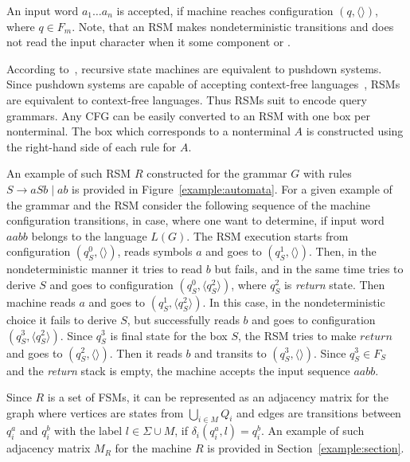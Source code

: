 An input word $a_1 \dots a_n$ is accepted, if machine reaches configuration $(q,\langle\rangle)$, where $q \in F_m$.
Note, that an RSM makes nondeterministic transitions and does not read the input character when it  some component or .

According to~\cite{rsm:analysis:10.1007/3-540-44585-4_18}, recursive state machines are equivalent to pushdown systems.
Since pushdown systems are capable of accepting context-free languages~\cite{automata:theory:10.5555/1177300}, RSMs are equivalent to context-free languages.
Thus RSMs suit to encode query grammars.
Any CFG can be easily converted to an RSM with one box per nonterminal.
The box which corresponds to a nonterminal $A$ is constructed using the right-hand side of each rule for $A$.

An example of such RSM $R$ constructed for the grammar $G$ with rules $S \to a S b \mid a b$ is provided in Figure~\ref{example:automata}. 
For a given example of the grammar and the RSM consider the following sequence of the machine configuration transitions, in case, where one want to determine, if input word $aabb$ belongs to the language $L(G)$. 
The RSM execution starts from configuration $(q_S^0,\langle \rangle)$, reads symbols $a$ and goes to $(q_S^1, \langle \rangle)$. 
Then, in the nondeterministic manner it tries to read $b$ but fails, and in the same time tries to derive $S$ and goes to configuration $(q_S^0, \langle q_S^2 \rangle)$, where $q_S^2$ is \textit{return} state. 
Then machine reads $a$ and goes to $(q_S^1, \langle q_S^2 \rangle)$. In this case, in the nondeterministic choice it fails to derive $S$, but successfully reads $b$ and goes to configuration $(q_S^3,\langle q_S^2 \rangle)$. 
Since $q_S^3$ is final state for the box $S$, the RSM tries to make $return$ and goes to $(q_S^2,\langle \rangle)$. 
Then it reads $b$ and transits to $(q_S^3,\langle \rangle)$. 
Since $q_S^3 \in F_S$ and the \textit{return} stack is empty, the machine accepts the input sequence $aabb$.

Since $R$ is a set of FSMs, it can be represented as an adjacency matrix for the graph where vertices are states from $\bigcup_{i \in M}Q_i$ and edges are transitions between $q_i^a$ and $q_i^b$ with the label $l \in \Sigma \cup M$, if $\delta_i (q_i^a, l) = q_i^b$.
An example of such adjacency matrix $M_R$ for the machine $R$ is provided in Section~\ref{example:section}.

